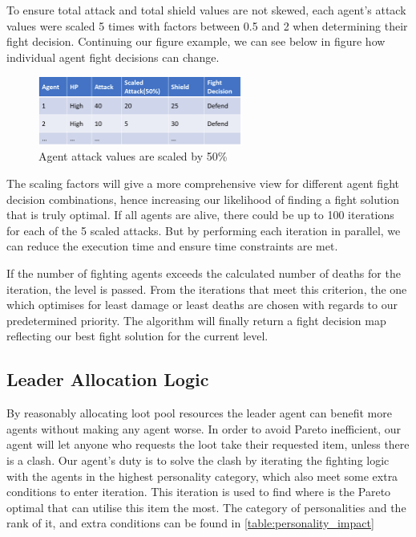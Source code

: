 To ensure total attack and total shield values are not skewed, each agent's attack values were scaled 5 times with factors between 0.5 and 2 when determining their fight decision. Continuing our figure example, we can see below in figure how individual agent fight decisions can change.
\begin{figure}[htb]
    \centering
    \includegraphics[width=0.6\textwidth]{008_team_5_agent_design/images/scaled-attack.PNG}
    \caption{Agent attack values are scaled by 50\%}
    \label{scaledattack}
\end{figure}

The scaling factors will give a more comprehensive view for different agent fight decision combinations, hence increasing our likelihood of finding a fight solution that is truly optimal. If all agents are alive, there could be up to 100 iterations for each of the 5 scaled attacks. But by performing each iteration in parallel, we can reduce the execution time and ensure time constraints are met.

If the number of fighting agents exceeds the calculated number of deaths for the iteration, the level is passed. From the iterations that meet this criterion, the one which optimises for least damage or least deaths are chosen with regards to our predetermined priority. The algorithm will finally return a fight decision map reflecting our best fight solution for the current level.

\subsection{Leader Allocation Logic}
By reasonably allocating loot pool resources the leader agent can benefit more agents without making any agent worse. In order to avoid Pareto inefficient, our agent will let anyone who requests the loot take their requested item, unless there is a clash. Our agent's duty is to solve the clash by iterating the fighting logic with the agents in the highest personality category, which also meet some extra conditions to enter iteration. This iteration is used to find where is the Pareto optimal that can utilise this item the most. The category of personalities and the rank of it, and extra conditions can be found in \ref{table:personality_impact}

